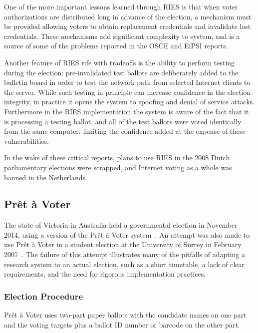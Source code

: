 One of the more important lessons learned through RIES is that when
voter authorizations are distributed long in advance of the election,
a mechanism must be provided allowing voters to obtain replacement
credentials and invalidate lost credentials. These mechanisms add
significant complexity to system, and is a source of some of the
problems reported in the OSCE and EiPSI reports.

Another feature of RIES rife with tradeoffs is the ability to perform
testing during the election: pre-invalidated test ballots are
deliberately added to the bulletin board in order to test the network
path from selected Internet clients to the server. While such testing
in principle can increase confidence in the election integrity, in
practice it opens the system to spoofing and denial of service
attacks. Furthermore in the RIES implementation the system is aware of
the fact that it is processing a testing ballot, and all of the test
ballots were voted identically from the same computer, limiting the
confidence added at the expense of these vulnerabilities.

In the wake of these critical reports, plans to use RIES in the 2008
Dutch parliamentary elections were scrapped, and Internet voting as a
whole was banned in the Netherlands.

\subsection{Prêt à Voter~\cite{chaum2005}}
\label{sec:pret-voter}

The state of Victoria in Australia held a governmental election in
November 2014, using a version of the Prêt à Voter
system~\cite{burton2012}. An attempt was also made to use Prêt à Voter
in a student election at the University of Surrey in February
2007~\cite{bismark2007}. The failure of this attempt illustrates many
of the pitfalls of adapting a research system to an actual election,
such as a short timetable, a lack of clear requirements, and the need
for rigorous implementation practices.

\subsubsection{Election Procedure}

Prêt à Voter uses two-part paper ballots with the candidate names on
one part and the voting targets plus a ballot ID number or barcode on
the other part.

